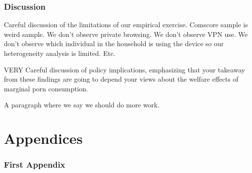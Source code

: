 






\section{Discussion}

Careful discussion of the limitations of our empirical exercise. Comscore sample is weird sample. We don't observe private browsing. We don't observe VPN use. We don't observe which individual in the household is using the device so our heterogeneity analysis is limited. Etc.

VERY Careful discussion of policy implications, emphasizing that your takeaway from these findings are going to depend your views about the welfare effects of marginal porn consumption. 

A paragraph where we say we should do more work. 
\clearpage

\newpage

\suppressfloats[t]

\clearpage

\appendix

\doublespacing
{} %
\part{Appendices} %
\parttoc %

\renewcommand{\thefigure}{\thesection.\arabic{figure}}
\renewcommand{\thetable}{\thesection.\arabic{table}}
\renewcommand{\theequation}{\thesection.\arabic{equation}}

\clearpage

\section{First Appendix}


